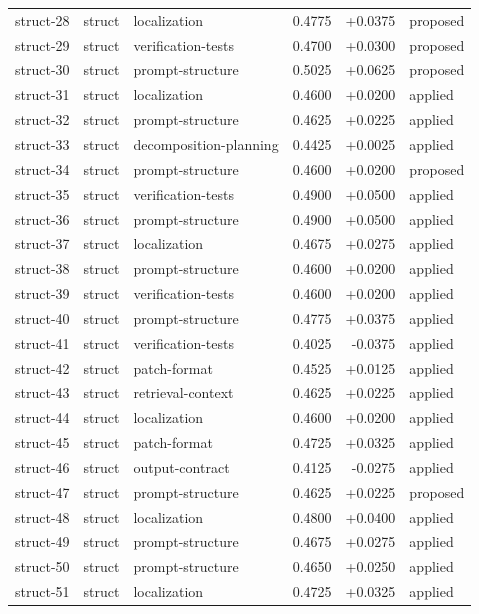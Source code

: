 \begin{center}
\begin{longtable}{llp{5.2cm}rrl}
struct-28 & struct & localization & 0.4775 & +0.0375 & proposed \\
struct-29 & struct & verification-tests & 0.4700 & +0.0300 & proposed \\
struct-30 & struct & prompt-structure & 0.5025 & +0.0625 & proposed \\
struct-31 & struct & localization & 0.4600 & +0.0200 & applied \\
struct-32 & struct & prompt-structure & 0.4625 & +0.0225 & applied \\
struct-33 & struct & decomposition-planning & 0.4425 & +0.0025 & applied \\
struct-34 & struct & prompt-structure & 0.4600 & +0.0200 & proposed \\
struct-35 & struct & verification-tests & 0.4900 & +0.0500 & applied \\
struct-36 & struct & prompt-structure & 0.4900 & +0.0500 & applied \\
struct-37 & struct & localization & 0.4675 & +0.0275 & applied \\
struct-38 & struct & prompt-structure & 0.4600 & +0.0200 & applied \\
struct-39 & struct & verification-tests & 0.4600 & +0.0200 & applied \\
struct-40 & struct & prompt-structure & 0.4775 & +0.0375 & applied \\
struct-41 & struct & verification-tests & 0.4025 & -0.0375 & applied \\
struct-42 & struct & patch-format & 0.4525 & +0.0125 & applied \\
struct-43 & struct & retrieval-context & 0.4625 & +0.0225 & applied \\
struct-44 & struct & localization & 0.4600 & +0.0200 & applied \\
struct-45 & struct & patch-format & 0.4725 & +0.0325 & applied \\
struct-46 & struct & output-contract & 0.4125 & -0.0275 & applied \\
struct-47 & struct & prompt-structure & 0.4625 & +0.0225 & proposed \\
struct-48 & struct & localization & 0.4800 & +0.0400 & applied \\
struct-49 & struct & prompt-structure & 0.4675 & +0.0275 & applied \\
struct-50 & struct & prompt-structure & 0.4650 & +0.0250 & applied \\
struct-51 & struct & localization & 0.4725 & +0.0325 & applied \\

\end{longtable}
\end{center}
